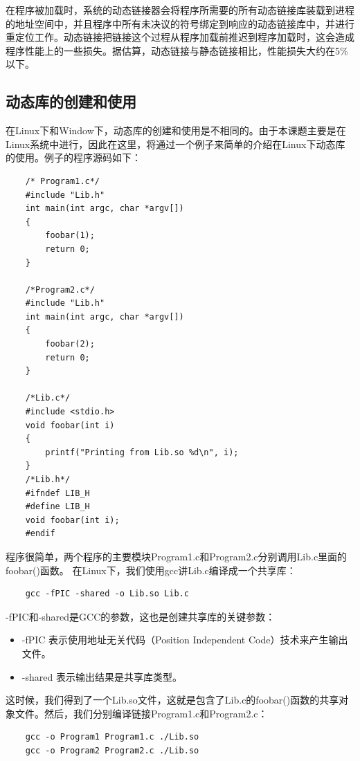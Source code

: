 \documentclass[12pt, twoside, a4paper, xetex]{report}
\begin{document}
	在程序被加载时，系统的动态链接器会将程序所需要的所有动态链接库装载到进程的地址空间中，并且程序中所有未决议的符号绑定到响应的动态链接库中，并进行重定位工作。动态链接把链接这个过程从程序加载前推迟到程序加载时，这会造成程序性能上的一些损失。据估算，动态链接与静态链接相比，性能损失大约在5\%以下。
	
	\subsection{动态库的创建和使用}
	在Linux下和Window下，动态库的创建和使用是不相同的。由于本课题主要是在Linux系统中进行，因此在这里，将通过一个例子来简单的介绍在Linux下动态库的使用。例子的程序源码如下：
	
	\begin{verbatim}
	/* Program1.c*/
	#include "Lib.h"
	int main(int argc, char *argv[])
	{
		foobar(1);
		return 0;
	}
	
	/*Program2.c*/
	#include "Lib.h"
	int main(int argc, char *argv[])
	{
		foobar(2);
		return 0;
	}
	
	/*Lib.c*/
	#include <stdio.h>
	void foobar(int i)
	{
		printf("Printing from Lib.so %d\n", i);
	}
	/*Lib.h*/
	#ifndef LIB_H
	#define LIB_H
	void foobar(int i);
	#endif
	\end{verbatim}
	
	程序很简单，两个程序的主要模块Program1.c和Program2.c分别调用Lib.c里面的foobar()函数。
	在Linux下，我们使用gcc讲Lib.c编译成一个共享库：
	\begin{verbatim}
	gcc -fPIC -shared -o Lib.so Lib.c
	\end{verbatim}
	-fPIC和-shared是GCC的参数，这也是创建共享库的关键参数：
	\begin{itemize}
		\item -fPIC 表示使用地址无关代码（Position Independent Code）技术来产生输出文件。
		\item -shared 表示输出结果是共享库类型。
	\end{itemize}
	
	这时候，我们得到了一个Lib.so文件，这就是包含了Lib.c的foobar()函数的共享对象文件。然后，我们分别编译链接Program1.c和Program2.c：
	\begin{verbatim}
	gcc -o Program1 Program1.c ./Lib.so
	gcc -o Program2 Program2.c ./Lib.so
	\end{verbatim}
	
\end{document}
